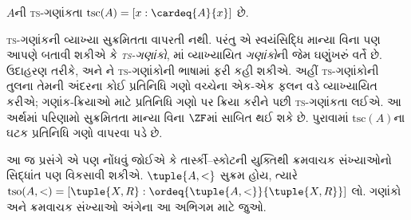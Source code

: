 \documentclass[../../../include/open-logic-section]{subfiles}
\begin{document}
\begin{defn}
$A$ની \textsc{ts}-ગણાંકતા
$\text{tsc}(A) = [x : \cardeq{A}{x}]$ છે.
\end{defn}

\textsc{ts}-ગણાંકની વ્યાખ્યા સુક્રમિતતા
વાપરતી નથી. પરંતુ એ સ્વયંસિદ્ધિ માન્યા
વિના પણ આપણે બતાવી શકીએ કે
\emph{\textsc{ts}-ગણાંકો},
માં
વ્યાખ્યાયિત \emph{ગણાંકો}ની જેમ ઘણુંખરું
વર્તે છે. ઉદાહરણ તરીકે,
અને ને
\textsc{ts}-ગણાંકોની ભાષામાં ફરી કહી શકીએ. અહીં
\textsc{ts}-ગણાંકોની તુલના તેમની અંદરના કોઈ પ્રતિનિધિ ગણો
વચ્ચેના એક-એક ફલન વડે વ્યાખ્યાયિત કરીએ; ગણાંક-ક્રિયાઓ માટે
પ્રતિનિધિ ગણો પર ક્રિયા કરીને પછી \textsc{ts}-ગણાંકતા લઈએ.
આ અર્થમાં પરિણામો સુક્રમિતતા માન્યા વિના $\ZF$માં સાબિત થઈ શકે છે.
પુરાવામાં $\text{tsc}(A)$ના ઘટક પ્રતિનિધિ ગણો વાપરવા પડે છે.

આ જ પ્રસંગે એ પણ નોંધવું જોઈએ કે
તાર્સ્કી--સ્કોટની યુક્તિથી ક્રમવાચક
સંખ્યાઓનો સિદ્ધાંત પણ વિકસાવી શકીએ.
$\tuple{A, <}$ સુક્રમ હોય, ત્યારે
$\text{tso}(A, <) = [\tuple{X,
R} : \ordeq{\tuple{A, <}}{\tuple{X, R}}]$ લો.
ગણાંકો અને ક્રમવાચક સંખ્યાઓ અંગેના આ
અભિગમ માટે \citet[chs.~9--12]{Potter2004} જુઓ.
\end{document}
